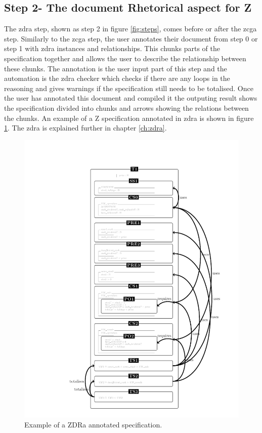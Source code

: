\subsection{Step 2- The document Rhetorical aspect for Z}

The \gls{zdra} step, shown as step 2 in figure \ref{fig:steps}, comes before or
after the \gls{zcga} step. Similarly to the \gls{zcga} step, the user annotates
their document from step 0 or step 1 with \gls{zdra} instances and
relationships. This chunks parts of the specification together and allows the
user to describe the relationship between these chunks. The annotation is the
user input part of this step and the automation is the \gls{zdra} checker which
checks if there are any loops in the reasoning and gives warnings if the
specification still needs to be totalised. Once the user has annotated this
document and compiled it the outputing result shows the specification divided
into chunks and arrows showing the relations between the chunks. An example of a
Z specification annotated in \gls{zdra} is shown in figure
\ref{fig:zdraexample}. The \gls{zdra} is explained further in chapter
\ref{ch:zdra}.

\begin{figure}[H]
 \begin{center}
 \includegraphics [scale=0.25]{Figures/Design/zdracomp.png}
 \caption{Example of a ZDRa annotated specification.}
 \label{fig:zdraexample}
\end{center}
\end{figure} 

